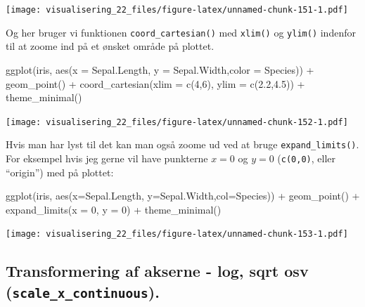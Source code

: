 \documentclass[
]{book}
\newenvironment{Shaded}{\begin{snugshade}}{\end{snugshade}}
\newcommand{\AttributeTok}[1]{\textcolor[rgb]{0.77,0.63,0.00}{#1}}
\newcommand{\DecValTok}[1]{\textcolor[rgb]{0.00,0.00,0.81}{#1}}
\newcommand{\FloatTok}[1]{\textcolor[rgb]{0.00,0.00,0.81}{#1}}
\newcommand{\FunctionTok}[1]{\textcolor[rgb]{0.00,0.00,0.00}{#1}}
\newcommand{\NormalTok}[1]{#1}
\newcommand{\SpecialCharTok}[1]{\textcolor[rgb]{0.00,0.00,0.00}{#1}}
\begin{document}
\texttt{[image: visualisering\_22\_files/figure-latex/unnamed-chunk-151-1.pdf]}

Og her bruger vi funktionen \texttt{coord\_cartesian()} med \texttt{xlim()} og \texttt{ylim()} indenfor til at zoome ind på et ønsket område på plottet.

\begin{Shaded}
\begin{Highlighting}[]
\FunctionTok{ggplot}\NormalTok{(iris, }\FunctionTok{aes}\NormalTok{(}\AttributeTok{x =}\NormalTok{ Sepal.Length, }\AttributeTok{y =}\NormalTok{ Sepal.Width,}\AttributeTok{color =}\NormalTok{ Species)) }\SpecialCharTok{+}
  \FunctionTok{geom\_point}\NormalTok{() }\SpecialCharTok{+} 
  \FunctionTok{coord\_cartesian}\NormalTok{(}\AttributeTok{xlim =} \FunctionTok{c}\NormalTok{(}\DecValTok{4}\NormalTok{,}\DecValTok{6}\NormalTok{), }\AttributeTok{ylim =} \FunctionTok{c}\NormalTok{(}\FloatTok{2.2}\NormalTok{,}\FloatTok{4.5}\NormalTok{)) }\SpecialCharTok{+}
  \FunctionTok{theme\_minimal}\NormalTok{() }
\end{Highlighting}
\end{Shaded}

\texttt{[image: visualisering\_22\_files/figure-latex/unnamed-chunk-152-1.pdf]}

Hvis man har lyst til det kan man også zoome ud ved at bruge \texttt{expand\_limits()}. For eksempel hvis jeg gerne vil have punkterne \(x = 0\) og \(y = 0\) (\texttt{c(0,0)}, eller ``origin'') med på plottet:

\begin{Shaded}
\begin{Highlighting}[]
\FunctionTok{ggplot}\NormalTok{(iris, }\FunctionTok{aes}\NormalTok{(}\AttributeTok{x=}\NormalTok{Sepal.Length, }\AttributeTok{y=}\NormalTok{Sepal.Width,}\AttributeTok{col=}\NormalTok{Species)) }\SpecialCharTok{+}
  \FunctionTok{geom\_point}\NormalTok{() }\SpecialCharTok{+} 
  \FunctionTok{expand\_limits}\NormalTok{(}\AttributeTok{x =} \DecValTok{0}\NormalTok{, }\AttributeTok{y =} \DecValTok{0}\NormalTok{) }\SpecialCharTok{+}
  \FunctionTok{theme\_minimal}\NormalTok{() }
\end{Highlighting}
\end{Shaded}

\texttt{[image: visualisering\_22\_files/figure-latex/unnamed-chunk-153-1.pdf]}

\hypertarget{transformering-af-akserne---log-sqrt-osv-scale_x_continuous.}{%
\subsection{\texorpdfstring{Transformering af akserne - log, sqrt osv (\texttt{scale\_x\_continuous}).}{Transformering af akserne - log, sqrt osv (scale\_x\_continuous).}}\label{transformering-af-akserne---log-sqrt-osv-scale_x_continuous.}}
\end{document}
